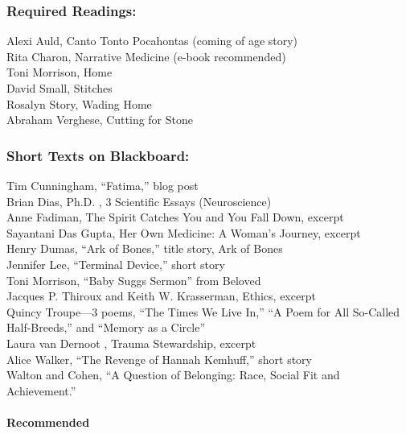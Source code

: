 \documentclass[12pt]{article}
\let\oldparagraph\paragraph
\renewcommand{\paragraph}[1]{\oldparagraph{#1}\mbox{}}
\begin{document}
\subsubsection{Required Readings:}\label{required-readings}

Alexi Auld, Canto Tonto Pocahontas (coming of age story)\\
Rita Charon, Narrative Medicine (e-book recommended)\\
Toni Morrison, Home\\
David Small, Stitches\\
Rosalyn Story, Wading Home\\
Abraham Verghese, Cutting for Stone

\subsubsection{Short Texts on
Blackboard:}\label{short-texts-on-blackboard}

Tim Cunningham, ``Fatima,'' blog post\\
Brian Dias, Ph.D. , 3 Scientific Essays (Neuroscience)\\
Anne Fadiman, The Spirit Catches You and You Fall Down, excerpt\\
Sayantani Das Gupta, Her Own Medicine: A Woman's Journey, excerpt\\
Henry Dumas, ``Ark of Bones,'' title story, Ark of Bones\\
Jennifer Lee, ``Terminal Device,'' short story\\
Toni Morrison, ``Baby Suggs Sermon'' from Beloved\\
Jacques P. Thiroux and Keith W. Krasserman, Ethics, excerpt\\
Quincy Troupe---3 poems, ``The Times We Live In,'' ``A Poem for All
So-Called Half-Breeds,'' and ``Memory as a Circle''\\
Laura van Dernoot , Trauma Stewardship, excerpt\\
Alice Walker, ``The Revenge of Hannah Kemhuff,'' short story\\
Walton and Cohen, ``A Question of Belonging: Race, Social Fit and
Achievement.''

\paragraph{Recommended}\label{recommended}
\end{document}
